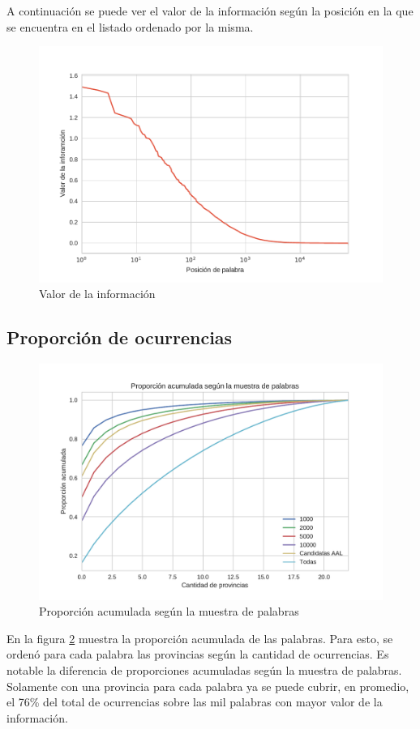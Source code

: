 A continuación se puede ver el valor de la información según la posición en la que se encuentra en el listado ordenado por la misma.

\begin{figure}[!ht]
\centering
\includegraphics[width=1.0\textwidth]{./images/ivaluesLog.pdf}
\caption{Valor de la información} 
\label{fig:ivalue} 
\end{figure}


\subsection{Proporción de ocurrencias} %
\label{sub:proporcionDeOcurrencias}

\begin{figure}[!ht]
\centering
\includegraphics[width=1.0\textwidth]{./images/PropAcum.pdf}
\caption{Proporción acumulada según la muestra de palabras} 
\label{fig:propAcum} 
\end{figure}
En la figura \ref{fig:propAcum} muestra la proporción acumulada de las palabras. Para esto, se ordenó para cada palabra las provincias según la cantidad de ocurrencias. Es notable la diferencia de proporciones acumuladas según la muestra de palabras. Solamente con una provincia para cada palabra ya se puede cubrir, en promedio, el 76\% del total de ocurrencias sobre las mil palabras con mayor valor de la información.

